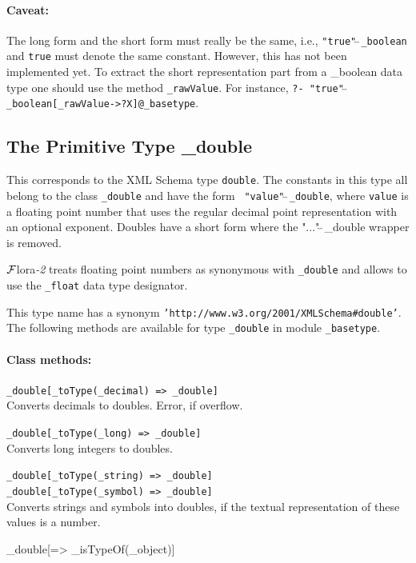 \documentclass[11pt]{article}
\newcommand{\FLORA}{{\mbox{\sc ${\cal F}${lora}\rm\emph{-2}}}\xspace}
\begin{document}
\paragraph{Caveat:}  The long form and the short form must really be the
same, i.e., {\tt "true"$\hat{~}\hat{~}$\_boolean} and {\tt true}
must denote the same constant.  However, this has not been implemented yet.
To extract the short representation part from a \_boolean data
type one should use the method {\tt \_rawValue}.  For instance,
{\tt ?- "true"$\hat{~}\hat{~}$\_boolean[\_rawValue->?X]@\_basetype}.

\subsection{ The Primitive Type \_double}

This corresponds to the XML Schema type {\tt double}.  The constants in
this type all belong to the class {\tt \_double} and have the form {\tt
  "value"$\hat{~}\hat{~}$\_double}, where {\tt value} is a floating point number that uses
the regular decimal point representation with an optional exponent.
Doubles have a short form where the "..."$\hat{~}\hat{~}$\_double wrapper is removed.

\FLORA treats floating point numbers as synonymous with {\tt \_double} and
allows to use the {\tt \_float} data type designator.  

This type name has a synonym {\tt 'http://www.w3.org/2001/XMLSchema\#double'}. 
The following methods are available for type {\tt \_double} in module
{\tt \_basetype}.  


\paragraph{Class methods:}
\begin{itemize}
\item {\tt \_double[\_toType(\_decimal) => \_double]}\\  
  Converts decimals to doubles. Error, if overflow.
 \item {\tt \_double[\_toType(\_long) => \_double]}\\  
  Converts long integers to doubles.
 \item {\tt \_double[\_toType(\_string) => \_double]}\\  
 {\tt \_double[\_toType(\_symbol) => \_double]}\\
  Converts strings and symbols into doubles, if the textual representation
  of these values is a number.
{\tt \item \_double[=> \_isTypeOf(\_object)]}  
\end{itemize}
\end{document}
